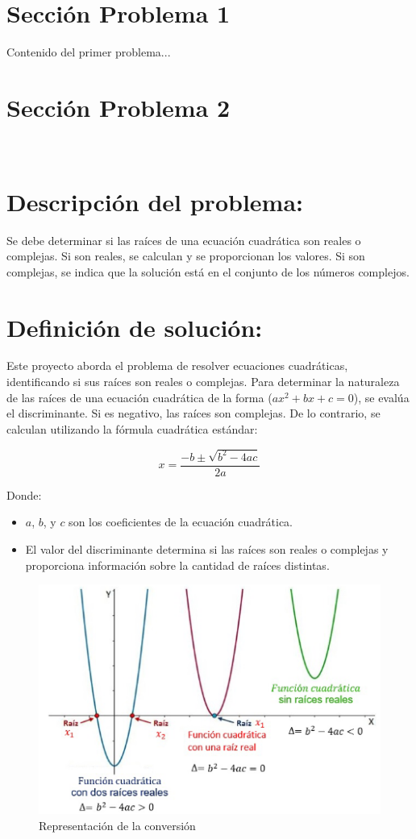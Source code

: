 \documentclass{IEEEcsmag}
\begin{document}
\section{Sección Problema 1}
Contenido del primer problema...
\clearpage







\section{Sección Problema 2} \\

\section*{Descripción del problema:}
Se debe determinar si las raíces de una ecuación cuadrática son reales o complejas. Si son reales, se calculan y se proporcionan los valores. Si son complejas, se indica que la solución está en el conjunto de los números complejos.


\section*{Definición de solución:}
Este proyecto aborda el problema de resolver ecuaciones cuadráticas, identificando si sus raíces son reales o complejas. 
Para determinar la naturaleza de las raíces de una ecuación cuadrática de la forma  (\(ax^2 + bx + c = 0\)), se evalúa el discriminante. Si es negativo, las raíces son complejas. De lo contrario, se calculan utilizando la fórmula cuadrática estándar:

\[ x = \frac{-b \pm \sqrt{b^2 - 4ac}}{2a} \]

Donde:
\begin{itemize}
    \item \(a\), \(b\), y \(c\) son los coeficientes de la ecuación cuadrática.
    \item El valor del discriminante determina si las raíces son reales o complejas y proporciona información sobre la cantidad de raíces distintas.
\end{itemize}


\begin{figure}[h!]
    \centering
    \includegraphics[width=0.6\linewidth]{latex-imagenes/graficaP1.png}
    \caption{Representación de la conversión}
    \label{fig: Grafica Ecuacion Recta}
\end{figure}
\end{document}
